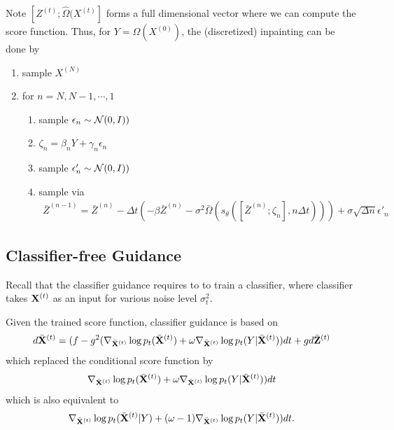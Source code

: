 \documentclass[11pt]{article}
\begin{document}
Note $[Z^{(t)};\hat{\Omega}(X^{(t)}]$ forms a full dimensional vector where we can compute the score function.
Thus, for $Y = \Omega(X^{(0)})$, the (discretized) inpainting can be done by
\begin{enumerate}
    \item sample  $X^{(N)}$
    \item for $n = N, N-1, \cdots, 1$
    \begin{enumerate}
        \item sample $\epsilon_n \sim {\cal N}(0, I))$
        \item $\zeta_n = \beta_n Y + \gamma_n \epsilon_n$
        \item sample $\epsilon'_n \sim {\cal N}(0, I))$
        \item sample via
        \begin{align}
            \bar{Z}^{(n-1)} = \bar{Z}^{(n)} - \Delta t (-\beta \bar{Z}^{(n)} - \sigma^2 \bar{\Omega}(s_{\theta}([\bar{Z}^{(n)}; \zeta_n], n\Delta t)))
                +\sigma\sqrt{\Delta n}\epsilon'_n
        \end{align}
    \end{enumerate}
\end{enumerate}


\subsection{Classifier-free Guidance~\cite{ho2022classifier}}
Recall that the classifier guidance requires to to train a classifier,
where classifier takes ${\bf X}^{(t)}$ as an input for various noise level $\sigma^2_t$.

Given the trained score function, classifier guidance is based on 
\begin{align}
    d\bar{{\bf X}}^{(t)} = (f - g^2 (\nabla_{\bar{{\bf X}}^{(t)}} \log p_t (\bar{{\bf X}}^{(t)}) 
    + \omega \nabla_{\bar{{\bf X}}^{(t)}} \log p_t (Y|\bar{{\bf X}}^{(t)}))dt + g d\bar{{\bf Z}}^{(t)}
\end{align}
which replaced the conditional score function by
\begin{align}
\nabla_{\bar{{\bf X}}^{(t)}} \log p_t (\bar{{\bf X}}^{(t)} ) + \omega \nabla_{\bar{{\bf X}}^{(t)}} \log p_t (Y|\bar{{\bf X}}^{(t)}))dt
\end{align}
which is also equivalent to
\begin{align}
\nabla_{\bar{{\bf X}}^{(t)}} \log p_t (\bar{{\bf X}}^{(t)} |Y ) + (\omega-1) \nabla_{\bar{{\bf X}}^{(t)}} \log p_t (Y|\bar{{\bf X}}^{(t)}))dt.
\end{align}
\end{document}
